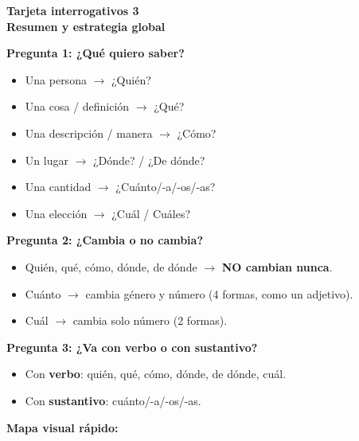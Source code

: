 \documentclass[a4paper,10pt]{article}
\newcommand{\interrheader}[2]{%
  \noindent
  \colorbox{naranjainterr!90}{\parbox{\dimexpr\linewidth-2\fboxsep}{%
    \centering\color{white}\bfseries\large Tarjeta interrogativos #1\\[2pt]
    \normalsize #2%
  }}
  \vspace{4pt}
}
\begin{document}
\newpage

\interrheader{3}{Resumen y estrategia global}

\vspace{6pt}
\small

\begin{tcolorbox}[colback=naranjainterr!6, colframe=naranjainterr!50, boxrule=0.8pt, left=6pt, right=6pt, top=6pt, bottom=6pt, title={\textbf{Tres preguntas para elegir el interrogativo correcto}}, coltitle=white, fonttitle=\bfseries]
\textbf{Pregunta 1: ¿Qué quiero saber?}
\begin{itemize}[nosep, leftmargin=1.2em]
\item Una persona $\to$ ¿Quién?
\item Una cosa / definición $\to$ ¿Qué?
\item Una descripción / manera $\to$ ¿Cómo?
\item Un lugar $\to$ ¿Dónde? / ¿De dónde?
\item Una cantidad $\to$ ¿Cuánto/-a/-os/-as?
\item Una elección $\to$ ¿Cuál / Cuáles?
\end{itemize}

\vspace{4pt}
\textbf{Pregunta 2: ¿Cambia o no cambia?}
\begin{itemize}[nosep, leftmargin=1.2em]
\item Quién, qué, cómo, dónde, de dónde $\to$ \textbf{NO cambian nunca}.
\item Cuánto $\to$ cambia género y número (4 formas, como un adjetivo).
\item Cuál $\to$ cambia solo número (2 formas).
\end{itemize}

\vspace{4pt}
\textbf{Pregunta 3: ¿Va con verbo o con sustantivo?}
\begin{itemize}[nosep, leftmargin=1.2em]
\item Con \textbf{verbo}: quién, qué, cómo, dónde, de dónde, cuál.
\item Con \textbf{sustantivo}: cuánto/-a/-os/-as.
\end{itemize}
\end{tcolorbox}

\vspace{10pt}

\textbf{Mapa visual rápido:}
\end{document}

